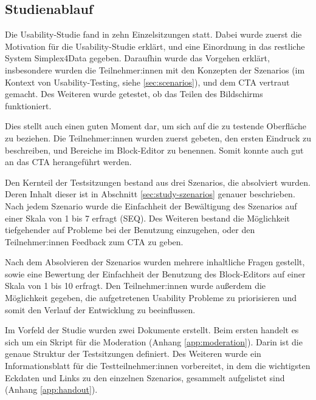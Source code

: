 \subsection{Studienablauf}

Die Usability-Studie fand in zehn Einzelsitzungen statt. Dabei wurde zuerst die Motivation für die Usability-Studie erklärt, und eine Einordnung in das restliche System Simplex4Data gegeben. Daraufhin wurde das Vorgehen erklärt, insbesondere wurden die Teilnehmer:innen mit den Konzepten der Szenarios (im Kontext von Usability-Testing, siehe \ref{sec:scenarios}), und dem \ac{CTA} vertraut gemacht. Des Weiteren wurde getestet, ob das Teilen des Bildschirms funktioniert.

Dies stellt auch einen guten Moment dar, um sich auf die zu testende Oberfläche zu beziehen. Die Teilnehmer:innen wurden zuerst gebeten, den ersten Eindruck zu beschreiben, und Bereiche im Block-Editor zu benennen. Somit konnte auch gut an das \ac{CTA} herangeführt werden.

Den Kernteil der Testsitzungen bestand aus drei Szenarios, die absolviert wurden. Deren Inhalt dieser ist in Abschnitt \ref{sec:study-szenarios} genauer beschrieben. Nach jedem Szenario wurde die Einfachheit der Bewältigung des Szenarios auf einer Skala von 1 bis 7 erfragt (\ac{SEQ}). Des Weiteren bestand die Möglichkeit tiefgehender auf Probleme bei der Benutzung einzugehen, oder den Teilnehmer:innen Feedback zum \ac{CTA} zu geben.

Nach dem Absolvieren der Szenarios wurden mehrere inhaltliche Fragen gestellt, sowie eine Bewertung der Einfachheit der Benutzung des Block-Editors auf einer Skala von 1 bis 10 erfragt. Den Teilnehmer:innen wurde außerdem die Möglichkeit gegeben, die aufgetretenen Usability Probleme zu priorisieren und somit den Verlauf der Entwicklung zu beeinflussen.

Im Vorfeld der Studie wurden zwei Dokumente erstellt. Beim ersten handelt es sich um ein Skript für die Moderation (Anhang \ref{app:moderation}). Darin ist die genaue Struktur der Testsitzungen definiert. Des Weiteren wurde ein Informationsblatt für die Testteilnehmer:innen vorbereitet, in dem die wichtigsten Eckdaten und Links zu den einzelnen Szenarios, gesammelt aufgelistet sind (Anhang \ref{app:handout}).
